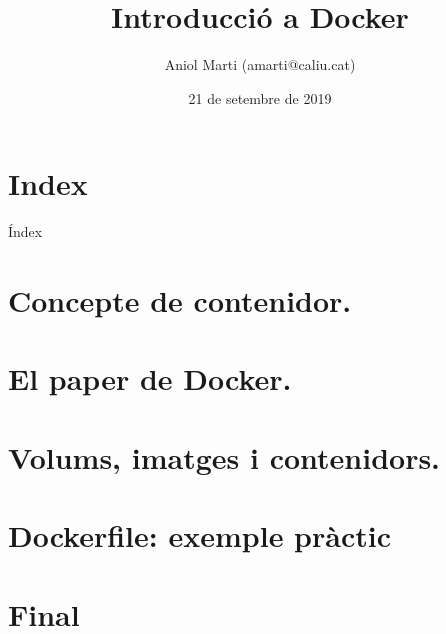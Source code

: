 \documentclass[aspectratio=149,dvipsnames,svgnames,unicode]{beamer}
\title{Introducció a Docker}
\author{Aniol Marti (amarti@caliu.cat)}
\institute[Caliu]{Caliu - Catalan Linux Users}
\date{21 de setembre de 2019}
\begin{document}
\begin{frame}[plain]
   \titlepage
\end{frame}  

\section*{Index}
\begin{frame}{Índex}
	\tableofcontents
\end{frame}

\section{Concepte de contenidor.}

\section{El paper de Docker.}

\section{Volums, imatges i contenidors.}

\section{Dockerfile: exemple pràctic}


\section*{Final}

\end{document}

